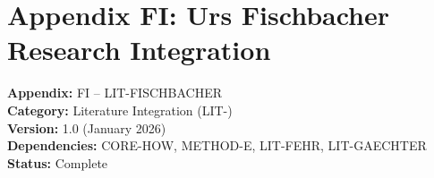 
\chapter*{Appendix FI: Urs Fischbacher Research Integration}
\label{app:fischbacher}

\begin{tcolorbox}[colback=white,colframe=black!75!white,title=Appendix Metadata]
\textbf{Appendix:} FI -- LIT-FISCHBACHER \\
\textbf{Category:} Literature Integration (LIT-) \\
\textbf{Version:} 1.0 (January 2026) \\
\textbf{Dependencies:} CORE-HOW, METHOD-E, LIT-FEHR, LIT-GAECHTER \\
\textbf{Status:} Complete
\end{tcolorbox}

